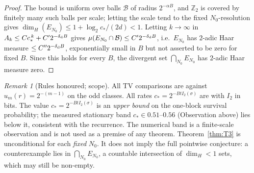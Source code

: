 \documentclass[12pt,a4paper]{article}
\theoremstyle{remark}
\newtheorem{remark}[theorem]{Remark}
\begin{document}
\begin{proof}
The bound is uniform over balls $\mathcal B$ of radius $2^{-\alpha B}$, and
$\mathbb{Z}_2$ is covered by finitely many such balls per scale; letting the scale tend
to the fixed $N_0$-resolution gives $\dim_H(E_{N_0})\le1+\log_2 c_*/(2d)<1$.
Letting $k\to\infty$ in $A_k\le Cc_*^{\,k}+C'2^{-\delta_{\rm d}B}$ gives
$\mu(E_{N_0}\cap\mathcal B)\le C'2^{-\delta_{\rm d}B}$, i.e.\ $E_{N_0}$ has
$2$-adic Haar measure $\le C''2^{-\delta_{\rm d}B}$, exponentially small in $B$
but not asserted to be zero for fixed $B$. Since this holds for every $B$,
the divergent set $\bigcap_{N_0}E_{N_0}$ has $2$-adic Haar measure zero.
\end{proof}
\begin{remark}[Rules honoured; scope]
All TV comparisons are against $
u_m(r)=2^{-(m-1)}$ on the odd
classes. All rates $c_*=2^{-BtI_2(\sigma)}$ are with $I_2$ in bits. The value $c_*=2^{-BtI_2(\sigma)}$ is an \emph{upper bound} on the one-block
survival probability; the measured stationary band $c_*\in0.51$--$0.56$
(Observation above) lies below it, consistent with the recurrence. The numerical
band is a finite-scale observation and is not used as a premise of any theorem. Theorem~\ref{thm:T3} is unconditional for each \emph{fixed} $N_0$. It does not imply the full pointwise conjecture: a counterexample lies in $\bigcap_{N_0}E_{N_0}$, a countable intersection of $\dim_H<1$ sets, which may still be non-empty.
\end{remark}
\end{document}
